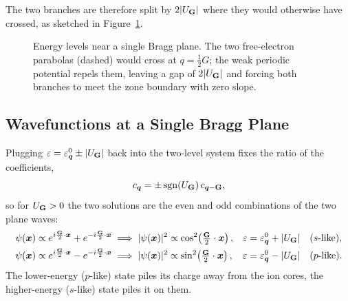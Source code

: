 The two branches are therefore split by $2|U_{\cvect{G}}|$ where they would otherwise have crossed, as sketched in Figure~\ref{fig:bloch-gap}.

\begin{figure}[ht]
\centering
{}
\caption{Energy levels near a single Bragg plane. The two free-electron parabolas (dashed) would cross at $q=\tfrac{1}{2}G$; the weak periodic potential repels them, leaving a gap of $2|U_{\cvect{G}}|$ and forcing both branches to meet the zone boundary with zero slope.}
\label{fig:bloch-gap}
\end{figure}

\subsection{Wavefunctions at a Single Bragg Plane}

Plugging $\varepsilon = \varepsilon^0_{\lvect{q}} \pm |U_{\cvect{G}}|$ back into the two-level system fixes the ratio of the coefficients,
\begin{equation}
    c_{\lvect{q}} = \pm \operatorname{sgn}(U_{\cvect{G}})\, c_{\lvect{q}-\cvect{G}},
\end{equation}
so for $U_{\cvect{G}} > 0$ the two solutions are the even and odd combinations of the two plane waves:
\begin{align}
    \psi(\lvect{x}) &\propto e^{i\frac{\cvect{G}}{2}\cdot\lvect{x}} + e^{-i\frac{\cvect{G}}{2}\cdot\lvect{x}}
    \;\Longrightarrow\; |\psi(\lvect{x})|^2 \propto \cos^2\!\left(\tfrac{\cvect{G}}{2}\cdot\lvect{x}\right),
    && \varepsilon = \varepsilon^0_{\lvect{q}} + |U_{\cvect{G}}| \quad \text{($s$-like)}, \\
    \psi(\lvect{x}) &\propto e^{i\frac{\cvect{G}}{2}\cdot\lvect{x}} - e^{-i\frac{\cvect{G}}{2}\cdot\lvect{x}}
    \;\Longrightarrow\; |\psi(\lvect{x})|^2 \propto \sin^2\!\left(\tfrac{\cvect{G}}{2}\cdot\lvect{x}\right),
    && \varepsilon = \varepsilon^0_{\lvect{q}} - |U_{\cvect{G}}| \quad \text{($p$-like)}.
\end{align}
The lower-energy ($p$-like) state piles its charge away from the ion cores, the higher-energy ($s$-like) state piles it on them.

